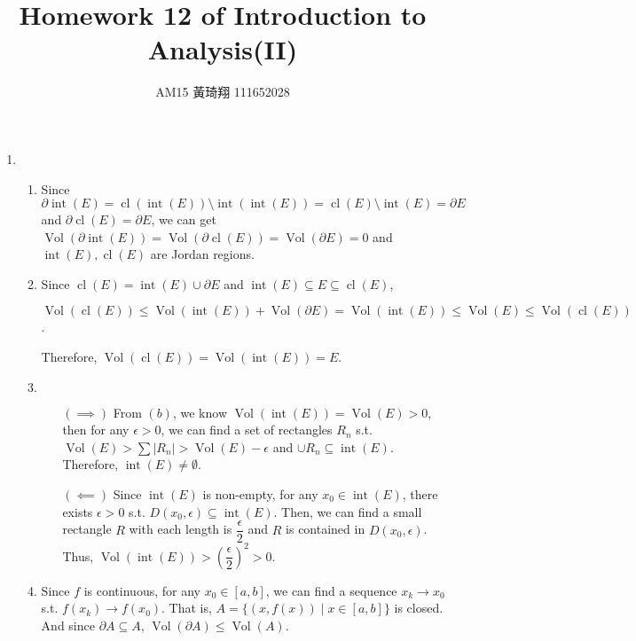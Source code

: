 \documentclass[12pt]{article}
\title{Homework 12 of Introduction to Analysis(II)}
\author{AM15 黃琦翔 111652028}
\DeclareMathOperator{\volume}{Vol}
\DeclareMathOperator{\interior}{int}
\DeclareMathOperator{\closure}{cl}
\newcommand{\boundary}{\partial}
\begin{document}
\maketitle
\begin{enumerate}
    \item \begin{enumerate}
        \item Since  $\boundary \interior(E) = \closure(\interior(E)) \setminus \interior(\interior(E)) = \closure(E) \setminus \interior(E) = \boundary E$ and $\boundary \closure(E) = \boundary E$,
        we can get $\volume(\boundary\interior(E)) = \volume(\boundary\closure(E)) = \volume(\boundary E) = 0$ and $\interior(E), \closure(E)$ are Jordan regions.

        \item Since $\closure(E) = \interior(E) \cup \boundary E$ and $\interior(E)\subseteq E \subseteq \closure(E)$,

        $\volume(\closure(E)) \leq \volume(\interior(E)) + \volume(\boundary E) = \volume(\interior(E))\leq \volume(E) \leq \volume(\closure(E))$.

        Therefore, $\volume(\closure(E)) = \volume(\interior(E)) = E$.

        \item $\ $
        \begin{enumerate}
            \item[$(\implies)$] From $(b)$, we know $\volume(\interior(E)) = \volume(E) > 0$, 
            then for any $\epsilon > 0$, we can find a set of rectangles $R_n$ s.t. $\volume(E) > \sum |R_n| > \volume(E) - \epsilon$ and $\cup R_n \subseteq \interior(E)$.
            Therefore, $\interior(E) \neq \emptyset$.

            \item[$(\impliedby)$] Since $\interior(E)$ is non-empty, for any $x_0\in \interior(E)$, there exists $\epsilon > 0$ s.t. $D(x_0, \epsilon) \subseteq \interior(E)$.
            Then, we can find a small rectangle $R$ with each length is $\dfrac{\epsilon}{2}$ and $R$ is contained in $D(x_0, \epsilon)$.
            Thus, $\volume(\interior(E)) > \left(\dfrac{\epsilon}{2}\right)^2 > 0$.
        \end{enumerate}

        \item Since $f$ is continuous, for any $x_0 \in [a, b]$, we can find a sequence $x_k \to x_0$ s.t. $f(x_k) \to f(x_0)$.
        That is, $A = \{(x, f(x)) \mid x\in [a, b]\}$ is closed.
        And since $\boundary A \subseteq A$, $\volume(\boundary A) \leq \volume(A)$.
        

\end{enumerate}
\end{enumerate}
\end{document}
